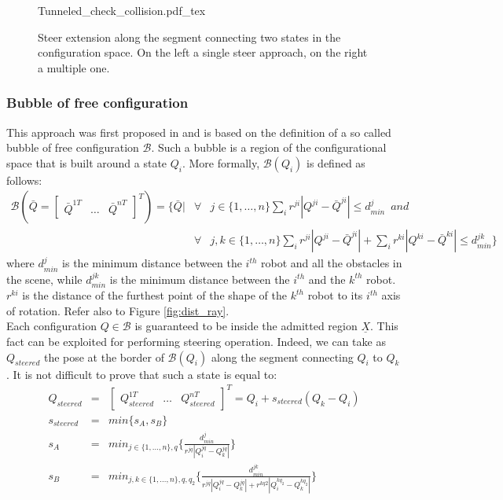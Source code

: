  \begin{figure}
	 \centering
 \def\svgwidth{0.45 \columnwidth}
 {Tunneled_check_collision.pdf_tex} 
	 \caption{Steer extension along the segment connecting two states in the configuration space. On the left a single steer approach, on the right a multiple one.}
 \label{fig:Tunnel_check}
 \end{figure}

\subsubsection{Bubble of free configuration}

This approach was first proposed in \cite{Bubble} and is based on the definition of a so called bubble of free configuration $\mathcal{B}$. Such a bubble is a region of the configurational space that is built around a state $Q_i$. More formally, $\mathcal{B}(Q_i)$ is defined as follows:
\begin{eqnarray}
\mathcal{B}(\bar{Q} = \begin{bmatrix} \bar{Q}^{1T} & \hdots & \bar{Q}^{nT} \end{bmatrix}^T) = \bigg \lbrace 
\bar{Q} \bigg | & \forall & j \in \lbrace 1,\hdots,n \rbrace \sum_i r^{ji} | Q^{ji} - \bar{Q}^{ji} | \leq d^j_{min} \,\,\,
 \textit{and} \nonumber\\
 & \forall & j,k \in \lbrace 1,\hdots,n \rbrace \sum_i r^{ji} | Q^{ji} - \bar{Q}^{ji} | + \sum_i r^{ki} | Q^{ki} - \bar{Q}^{ki} | \leq d^{jk}_{min}
 \bigg \rbrace 
\end{eqnarray}
where $d^j_{min}$ is the minimum distance between the $i^{th}$ robot and all the obstacles in the scene, while $d^{jk}_{min}$ is the minimum distance between the $i^{th}$ and the $k^{th}$ robot. $r^{ki}$ is the distance of the furthest point of the shape of the $k^{th}$ robot to its $i^{th}$ axis of rotation. Refer also to Figure \ref{fig:dist_ray}.
\\
Each configuration $Q \in \mathcal{B}$ is guaranteed to be inside the admitted region $\underline{X}$. This fact can be exploited for performing steering operation.
Indeed, we can take as $Q_{steered}$ the pose at the border of $\mathcal{B}(Q_i)$ along the segment connecting $Q_i$ to $Q_k$. It is not difficult to prove that such a state is equal to:
\begin{eqnarray}
Q_{steered} &=& \begin{bmatrix} Q_{steered}^{1T} & \hdots & Q_{steered}^{nT} \end{bmatrix}^T =  Q_i + s_{steered} (Q_k - Q_i) \nonumber\\
s_{steered} &=& min \bigg \lbrace s_A, s_B \bigg \rbrace  \nonumber\\
s_A &=& min_{j\in \lbrace 1,\hdots,n \rbrace, q} \bigg \lbrace 
\frac{d^j_{min}}{r^{jq} | Q^{jq}_i - Q^{jq}_k |} 
\bigg \rbrace \nonumber\\
s_B &=& min_{j, k\in \lbrace 1,\hdots,n \rbrace, q,q_2} \bigg \lbrace 
\frac{d^{jk}_{min}}{r^{jq} | Q^{jq}_i - Q^{jq}_k | + r^{kq2} | Q^{kq_2}_i - Q^{kq_2}_k |}
\bigg \rbrace
\end{eqnarray}
